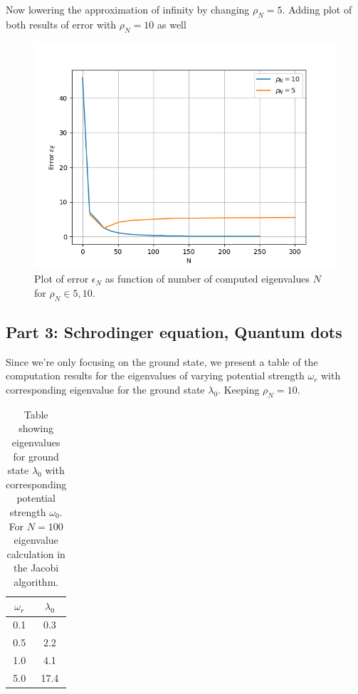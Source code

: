 \documentclass[aip,nobalancelastpage,
twocolumn,
rsi,%
 amsmath,amssymb,
 reprint,%
]{revtex4}
\begin{document}
Now lowering the approximation of infinity by changing $\rho_N=5$.
Adding plot of both results of error with $\rho_N=10$ as well
\begin{figure}[H]
\includegraphics[scale=0.6]{fig2.png}
\center
\caption{Plot of error $\epsilon_N$ as function of number of computed eigenvalues $N$ for $\rho_N \in {5,10}$.}
\label{part2: plot 2}
\end{figure}

\subsection{Part 3: Schrodinger equation, Quantum dots}
Since we're only focusing on the ground state, we present a table of the computation results for the eigenvalues of varying potential strength $\omega_r$ with corresponding eigenvalue for the ground state $\lambda_0$. Keeping $\rho_N = 10$.

\begin{table}[H]
\center
\caption{Table showing eigenvalues for ground state $\lambda_0$ with corresponding potential strength $\omega_0$. For $N=100$ eigenvalue calculation in the Jacobi algorithm.}
\begin{tabular}{|c | c |}
\hline
$\omega_r$ & $ \lambda_0$\\
\hline
0.1 & 0.3 \\
\hline
0.5 & 2.2\\
\hline
1.0 & 4.1\\
\hline
5.0 & 17.4\\
\hline
\end{tabular}
\label{part 3: table 1}
\end{table}
\end{document}
